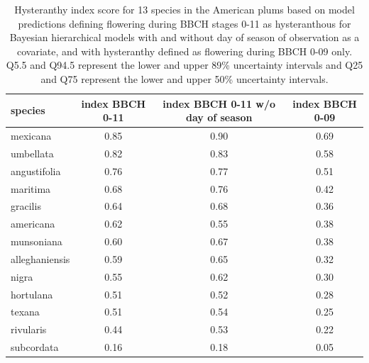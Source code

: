 \documentclass{article}[11pt]
\begin{document}
\begin{table}[ht]
\centering
\begin{tabular}{|lccc|}
  \hline
  species & index BBCH 0-11 & index BBCH 0-11 w/o day of season & index BBCH 0-09 \\ 
  \hline
 mexicana & 0.85 & 0.90 & 0.69 \\ 
  umbellata & 0.82 & 0.83 & 0.58 \\ 
 angustifolia & 0.76 & 0.77 & 0.51 \\ 
  maritima & 0.68 & 0.76 & 0.42 \\ 
 gracilis & 0.64 & 0.68 & 0.36 \\ 
  americana & 0.62 & 0.55 & 0.38 \\ 
  munsoniana & 0.60 & 0.67 & 0.38 \\ 
 alleghaniensis & 0.59 & 0.65 & 0.32 \\ 
  nigra & 0.55 & 0.62 & 0.30 \\ 
   hortulana & 0.51 & 0.52 & 0.28 \\ 
   texana & 0.51 & 0.54 & 0.25 \\ 
   rivularis & 0.44 & 0.53 & 0.22 \\ 
   subcordata & 0.16 & 0.18 & 0.05 \\ 
   \hline
\end{tabular}
\caption{Hysteranthy index score for 13 species in the American plums based on model predictions defining flowering during BBCH stages 0-11 as hysteranthous for Bayesian hierarchical models with and without day of season of observation as a covariate, and with hysteranthy defined as flowering during BBCH 0-09 only. Q5.5 and Q94.5 represent the lower and upper 89\% uncertainty intervals and Q25 and Q75 represent the lower and upper 50\% uncertainty intervals.}
\label{tab:mod1comps}
\end{table}
\end{document}
